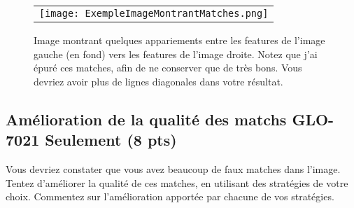 \documentclass[12pt]{article}
\begin{document}
\begin{figure}[ht]
 \begin{center}
  \begin{tabular}{c}
    \texttt{[image: ExempleImageMontrantMatches.png]}
  \end{tabular}
 \end{center}
\vspace{-0.25in}
 \caption{Image montrant quelques appariements entre les features de l'image gauche (en fond) vers les features de l'image droite. Notez que j'ai épuré ces matches, afin de ne conserver que de très bons. Vous devriez avoir plus de lignes diagonales dans votre résultat.}
 \label{ExempleImageMontrantMatches}
\end{figure}

\subsection{Amélioration de la qualité des matchs GLO-7021 Seulement (8 pts)}
Vous devriez constater que vous avez beaucoup de faux matches dans l'image. Tentez d'améliorer la qualité de ces matches, en utilisant des stratégies de votre choix. Commentez sur l'amélioration apportée par chacune de vos stratégies.
\end{document}

